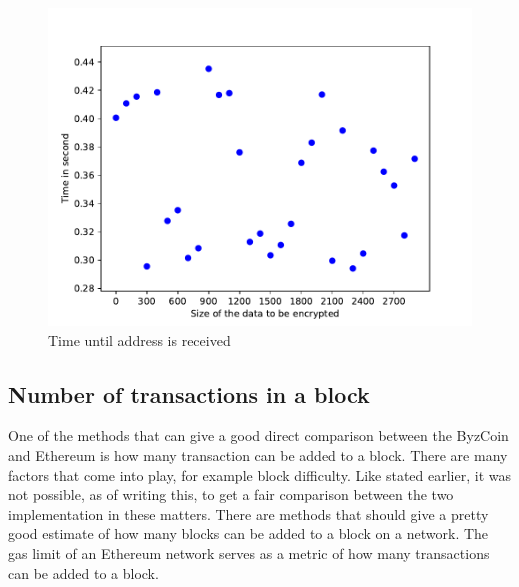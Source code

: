 \documentclass[12pt]{article}
\begin{document}
\begin{figure}[H]
    \centering
    \includegraphics[width=1\textwidth]{WriteTimeData.pdf}
    \caption{Time until address is received}
    \label{fig:contractsGasprices}
\end{figure}

\subsection{Number of transactions in a block}

One of the methods that can give a good direct comparison between the ByzCoin and Ethereum is how many transaction can be added to a block. There are many factors that come into play, for example block difficulty. Like stated earlier, it was not possible, as of writing this, to get a fair comparison between the two implementation in these matters. There are methods that should give a pretty good estimate of how many blocks can be added to a block on a network. The gas limit of an Ethereum network serves as a metric of how many transactions can be added to a block.
\end{document}
